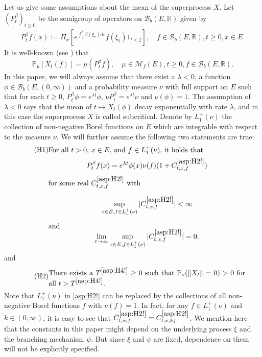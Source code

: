 \documentclass[12pt,a4paper]{amsart}
\numberwithin{equation}{section}
\theoremstyle{plain}
\theoremstyle{definition}
\theoremstyle{remark}
\begin{document}
	Let us give some assumptions about the mean of the superprocess $X$. 
	Let $(P_t^\beta)_{t\geq 0}$ be the semigroup of operators on $\mathcal B_b(E,\mathbb R)$ given by
\begin{align}
	P_t^\beta f(x)
	:= \Pi_x\left[e^{\int_0^t \beta(\xi_r)dr }f(\xi_t) 1_{t < \zeta}\right],
	\quad f\in \mathcal B_b(E,\mathbb R), t\geq 0, x\in E.
\end{align}
	It is well-known (see \cite[Proposition 2.27]{Li2011MeasureValued}) that
\begin{equation} \label{Fact:M!}
	\mathbb P_\mu[X_t(f)] = \mu (P_t^\beta f),
	\quad \mu \in \mathcal M_f(E), t\geq 0, f \in \mathcal B_b(E,\mathbb R).
\end{equation}	
	In this paper, we will always assume that there exist a $\lambda<0$, a function $\phi \in \mathcal B_b(E,(0,\infty))$ and a probability measure $\nu$ with full support on $E$ such that for each $t\geq 0$, $P_t^\beta \phi = e^{\lambda t}\phi$, $\nu P_t^\beta = e^{\lambda t} \nu$ and $\nu(\phi) = 1$.
	The assumption of $\lambda<0$ says that the mean of $t\mapsto X_t(\phi)$ decay exponentially with rate $\lambda$, and in this case the superprocess $X$ is called subcritical.
	Denote by $L_1^+(\nu)$ the collection of 
	non-negative Borel functions on $E$ which are integrable with respect to the measure $\nu$.
	We will further assume the following two statements are true:
\begin{align}
\label{asp:H2!} \tag{H1}
&\begin{minipage}{0.8\textwidth}
	For all $t>0$, $x\in E$, and $f\in L_1^+(\nu)$, it holds that
\end{minipage}
\\
&\begin{minipage}{0.8\textwidth}
	\[ P_t^\beta f(x) = e^{\lambda t} \phi(x) \nu(f) (1+ C^{\eqref{asp:H2!}}_{t,x,f})\]
	for some real $C^{\eqref{asp:H2!}}_{t,x,f}$ with \[\sup_{x\in E, f\in L_1^+(\nu)} |C^{\eqref{asp:H2!}}_{t,x,f}| < \infty\] and \[\lim_{t\to \infty} \sup_{x\in E, f\in L_1^+(\nu)} |C^{\eqref{asp:H2!}}_{t,x,f}| = 0.\]
\end{minipage}
\end{align}
	and
\begin{equation}
\label{asp:H4!} \tag{H2}
\begin{minipage}{0.8\textwidth}
	There exists a $T^{\eqref{asp:H4!}}\geq 0$ such that $\mathbb P_\nu(\|X_t\| = 0)>0$ for all $t> T^{\eqref{asp:H4!}}$.
\end{minipage}
\end{equation}
	Note that $L_1^+(\nu)$ in \eqref{asp:H2!} can be replaced by the collections of all non-negative Borel functions $f$ with $\nu(f) = 1$.
	In fact, for any $f\in L_1^+(\nu)$ and $k \in (0,\infty)$, it is easy to see that $C^{\eqref{asp:H2!}}_{t,x,f} = C^{\eqref{asp:H2!}}_{t,x,kf}$.
	We  mention here that the constants in this paper might depend on the underlying process $\xi$ and the branching mechanism $\psi$. But since $\xi$ and $\psi$ are fixed, dependence on them will not be explicitly specified.
\end{document}
